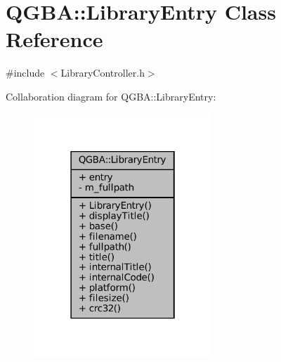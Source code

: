 \hypertarget{class_q_g_b_a_1_1_library_entry}{}\section{Q\+G\+BA\+:\+:Library\+Entry Class Reference}
\label{class_q_g_b_a_1_1_library_entry}


{\ttfamily \#include $<$Library\+Controller.\+h$>$}



Collaboration diagram for Q\+G\+BA\+:\+:Library\+Entry\+:
\nopagebreak
\begin{figure}[H]
\begin{center}
\leavevmode
\includegraphics[width=190pt]{class_q_g_b_a_1_1_library_entry__coll__graph}
\end{center}
\end{figure}
